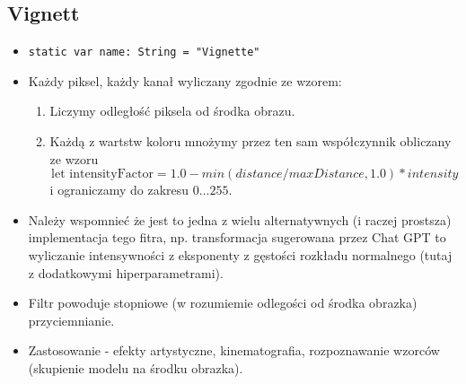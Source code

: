 \documentclass[a4paper]{article}
\begin{document}
\subsection{Vignett}

\begin{itemize}
    \item \texttt{static var name: String = "Vignette"}
    \item Każdy piksel, każdy kanał wyliczany zgodnie ze wzorem:
          \begin{enumerate}
              \item Liczymy odległość piksela od środka obrazu.
              \item Każdą z wartstw koloru mnożymy przez ten sam współczynnik obliczany ze wzoru
                    $$
                        \text{let intensityFactor} = 1.0 - min(distance / maxDistance, 1.0) * intensity
                    $$
                    i ograniczamy do zakresu $0...255$.
          \end{enumerate}
    \item Należy wspomnieć że jest to jedna z wielu alternatywnych (i raczej prostsza) implementacja tego fitra, np. transformacja sugerowana przez Chat GPT to wyliczanie intensywności z eksponenty z gęstości rozkładu normalnego (tutaj z dodatkowymi hiperparametrami).
    \item Filtr powoduje stopniowe (w rozumiemie odlegości od środka obrazka) przyciemnianie.
    \item Zastosowanie - efekty artystyczne, kinematografia, rozpoznawanie wzorców (skupienie modelu na środku obrazka).
\end{itemize}
\end{document}
